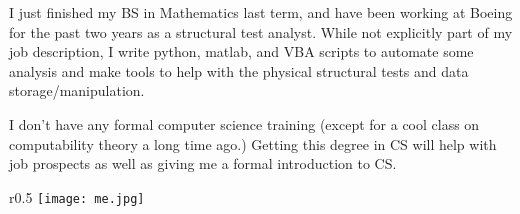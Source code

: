 \documentclass[letterpaper,12pt]{article}
\begin{document}
I just finished my BS in Mathematics last term, and have been working at Boeing for the past two years as a structural test analyst.  While not explicitly part of my job description, I write python, matlab, and  VBA scripts to automate some analysis and make tools to help with the physical structural tests and data storage/manipulation. 

I don't have any formal computer science training (except for a cool class on computability theory a long time ago.) Getting this degree in CS will help with job prospects as well as giving me a formal introduction to CS. 
\begin{wrapfigure}{r}{0.5\textwidth}
    \texttt{[image: me.jpg]}
\end{wrapfigure}
\end{document}
